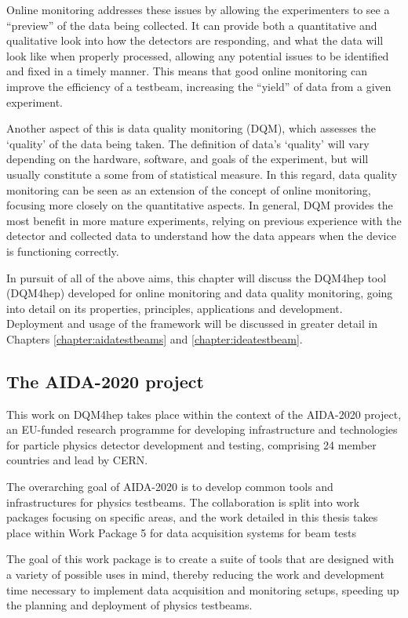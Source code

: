 Online monitoring addresses these issues by allowing the experimenters to see a ``preview'' of the data being collected. It can provide both a quantitative and qualitative look into how the detectors are responding, and what the data will look like when properly processed, allowing any potential issues to be identified and fixed in a timely manner. This means that good online monitoring can improve the efficiency of a testbeam, increasing the ``yield'' of data from a given experiment.

Another aspect of this is data quality monitoring (\acrshort{DQM}), which assesses the `quality' of the data being taken. The definition of data's `quality' will vary depending on the hardware, software, and goals of the experiment, but will usually constitute a some from of statistical measure. In this regard, data quality monitoring can be seen as an extension of the concept of online monitoring, focusing more closely on the quantitative aspects. In general, \acrshort{DQM} provides the most benefit in more mature experiments, relying on previous experience with the detector and collected data to understand how the data appears when the device is functioning correctly.  

In pursuit of all of the above aims, this chapter will discuss the \acrlong{DQM4hep} tool (\acrshort{DQM4hep}) developed for online monitoring and data quality monitoring, going into detail on its properties, principles, applications and development. Deployment and usage of the framework will be discussed in greater detail in Chapters \ref{chapter:aidatestbeams} and \ref{chapter:ideatestbeam}.

\subsection{The AIDA-2020 project}
This work on \acrshort{DQM4hep} takes place within the context of the AIDA-2020 project, an EU-funded research programme for developing infrastructure and technologies for particle physics detector development and testing, comprising 24 member countries and lead by \acrshort{CERN}.

The overarching goal of AIDA-2020 is to develop common tools and infrastructures for physics testbeams. The collaboration is split into work packages focusing on specific areas, and the work detailed in this thesis takes place within Work Package 5 for data acquisition systems for beam tests %

The goal of this work package is to create a suite of tools that are designed with a variety of possible uses in mind, thereby reducing the work and development time necessary to implement data acquisition and monitoring setups, speeding up the planning and deployment of physics testbeams. 

